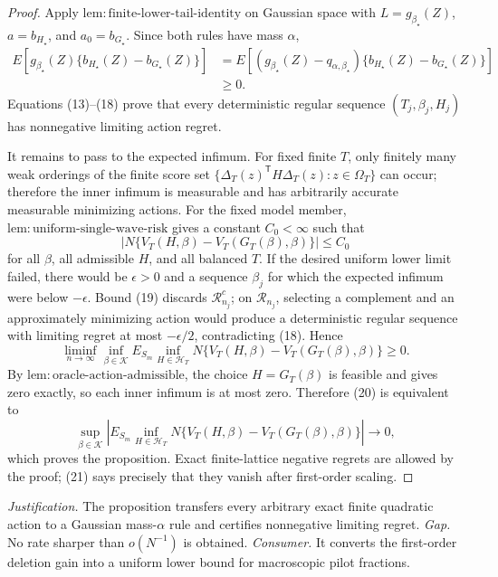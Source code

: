 \documentclass{article}
\begin{document}
\begin{proof}
Apply \(\mathrm{lem{:}finite\text{-}lower\text{-}tail\text{-}identity}\) on Gaussian space with
\(L=g_{\beta_\star}(Z)\), \(a=b_{H_\star}\), and \(a_0=b_{G_\star}\).  Since both rules have mass \(\alpha\),
\[
\begin{aligned}
E\!\left[g_{\beta_\star}(Z)
\{b_{H_\star}(Z)-b_{G_\star}(Z)\}\right]
&=E\!\left[(g_{\beta_\star}(Z)-q_{\alpha,\beta_\star})
\{b_{H_\star}(Z)-b_{G_\star}(Z)\}\right]\\
&\geq0.
\end{aligned}
\tag{18}
\]
Equations (13)--(18) prove that every deterministic regular sequence \((T_j,\beta_j,H_j)\) has nonnegative limiting action regret.

It remains to pass to the expected infimum.  For fixed finite \(T\), only finitely many weak orderings of the finite score set \(\{\Delta_T(z)^{\mathsf T}H\Delta_T(z):z\in\Omega_T\}\) can occur; therefore the inner infimum is measurable and has arbitrarily accurate measurable minimizing actions.  For the fixed model member, \(\mathrm{lem{:}uniform\text{-}single\text{-}wave\text{-}risk}\) gives a constant \(C_0<\infty\) such that
\[
\left|N\{V_T(H,\beta)-V_T(G_T(\beta),\beta)\}\right|
\leq C_0
\tag{19}
\]
for all \(\beta\), all admissible \(H\), and all balanced \(T\).  If the desired uniform lower limit failed, there would be \(\epsilon>0\) and a sequence \(\beta_j\) for which the expected infimum were below \(-\epsilon\).  Bound (19) discards \(\mathcal R_{n_j}^c\); on \(\mathcal R_{n_j}\), selecting a complement and an approximately minimizing action would produce a deterministic regular sequence with limiting regret at most \(-\epsilon/2\), contradicting (18).  Hence
\[
\liminf_{n\to\infty}\inf_{\beta\in\mathcal K}
E_{S_m}\inf_{H\in\mathcal H_T}
N\{V_T(H,\beta)-V_T(G_T(\beta),\beta)\}
\geq0.
\tag{20}
\]
By \(\mathrm{lem{:}oracle\text{-}action\text{-}admissible}\), the choice \(H=G_T(\beta)\) is feasible and gives zero exactly, so each inner infimum is at most zero.  Therefore (20) is equivalent to
\[
\sup_{\beta\in\mathcal K}
\left|
E_{S_m}\inf_{H\in\mathcal H_T}
N\{V_T(H,\beta)-V_T(G_T(\beta),\beta)\}
\right|\longrightarrow0,
\tag{21}
\]
which proves the proposition.  Exact finite-lattice negative regrets are allowed by the proof; (21) says precisely that they vanish after first-order scaling.
\end{proof}
\par\smallskip\noindent \textit{Justification.} The proposition transfers every arbitrary exact finite quadratic action to a Gaussian mass-\(\alpha\) rule and certifies nonnegative limiting regret. \textit{Gap.} No rate sharper than \(o(N^{-1})\) is obtained. \textit{Consumer.} It converts the first-order deletion gain into a uniform lower bound for macroscopic pilot fractions.
\end{document}
